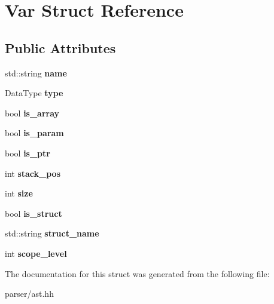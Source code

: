 \hypertarget{structVar}{}\section{Var Struct Reference}
\label{structVar}
\subsection*{Public Attributes}
\begin{DoxyCompactItemize}
\item 
\mbox{\label{structVar_ad112053ba9381eb7b8b26b3c5702410a}} 
std\+::string {\bfseries name}
\item 
\mbox{\label{structVar_a0427e1094cac6cabccfb4b2b319efdbe}} 
Data\+Type {\bfseries type}
\item 
\mbox{\label{structVar_ae84eb565b9e4390f166dce2df037a5b9}} 
bool {\bfseries is\+\_\+array}
\item 
\mbox{\label{structVar_ab87c3c3f83c53d692a4ae49d8c3168a7}} 
bool {\bfseries is\+\_\+param}
\item 
\mbox{\label{structVar_a1c363af1755401a56212506b2e664adc}} 
bool {\bfseries is\+\_\+ptr}
\item 
\mbox{\label{structVar_af421e2acd2de11fba4f4cbed04be31e7}} 
int {\bfseries stack\+\_\+pos}
\item 
\mbox{\label{structVar_a44bf35245e76f17f1c9895ae14df6286}} 
int {\bfseries size}
\item 
\mbox{\label{structVar_a50860725025944fb6dfd9f7b7c1d29dd}} 
bool {\bfseries is\+\_\+struct}
\item 
\mbox{\label{structVar_a39820e956bb56c03f5f7fcb296cbd620}} 
std\+::string {\bfseries struct\+\_\+name}
\item 
\mbox{\label{structVar_a7304b76d24f167834eea497b37a22856}} 
int {\bfseries scope\+\_\+level}
\end{DoxyCompactItemize}


The documentation for this struct was generated from the following file\+:\begin{DoxyCompactItemize}
\item 
parser/ast.\+hh\end{DoxyCompactItemize}
